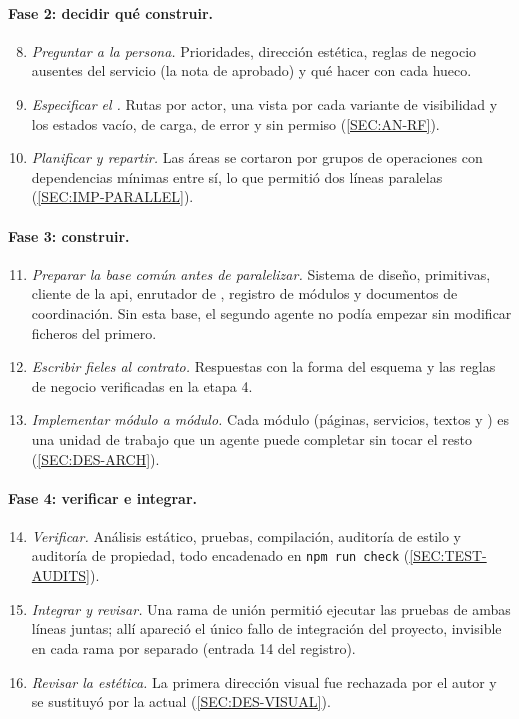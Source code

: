\paragraph{Fase 2: decidir qué construir.}
\begin{enumerate}
  \setcounter{enumi}{7}
  \item \emph{Preguntar a la persona.} Prioridades, dirección estética, reglas de negocio
        ausentes del servicio (la nota de aprobado) y qué hacer con cada hueco.
  \item \emph{Especificar el .} Rutas por actor, una vista por cada variante
        de visibilidad y los estados vacío, de carga, de error y sin permiso
        (\cref{SEC:AN-RF}).
  \item \emph{Planificar y repartir.} Las áreas se cortaron por grupos de operaciones con
        dependencias mínimas entre sí, lo que permitió dos líneas paralelas
        (\cref{SEC:IMP-PARALLEL}).
\end{enumerate}

\paragraph{Fase 3: construir.}
\begin{enumerate}
  \setcounter{enumi}{10}
  \item \emph{Preparar la base común antes de paralelizar.} Sistema de diseño, primitivas,
        cliente de la \acs{api}, enrutador de , registro de módulos y documentos de
        coordinación. Sin esta base, el segundo agente no podía empezar sin modificar
        ficheros del primero.
  \item \emph{Escribir  fieles al contrato.} Respuestas con la forma del esquema
        y las reglas de negocio verificadas en la etapa 4.
  \item \emph{Implementar módulo a módulo.} Cada módulo (páginas, servicios, textos y
        ) es una unidad de trabajo que un agente puede completar sin tocar el
        resto (\cref{SEC:DES-ARCH}).
\end{enumerate}

\paragraph{Fase 4: verificar e integrar.}
\begin{enumerate}
  \setcounter{enumi}{13}
  \item \emph{Verificar.} Análisis estático, pruebas, compilación, auditoría de estilo y
        auditoría de propiedad, todo encadenado en \texttt{npm run check}
        (\cref{SEC:TEST-AUDITS}).
  \item \emph{Integrar y revisar.} Una rama de unión permitió ejecutar las pruebas de ambas
        líneas juntas; allí apareció el único fallo de integración del proyecto, invisible en
        cada rama por separado (entrada 14 del registro).
  \item \emph{Revisar la estética.} La primera dirección visual fue rechazada por el autor y
        se sustituyó por la actual (\cref{SEC:DES-VISUAL}).
\end{enumerate}

